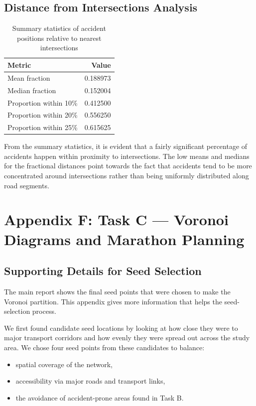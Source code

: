 \documentclass[acmsmall,nonacm,natbib=false]{acmart}
\begin{document}
\subsection{Distance from Intersections Analysis}
\label{appendix:part2taskB_q3}

\begin{table}[H]
\centering
\caption{Summary statistics of accident positions relative to nearest intersections}
\begin{tabular}{lr}
\toprule
Metric & Value \\
\midrule
Mean fraction & 0.188973 \\
Median fraction & 0.152004 \\
Proportion within 10\% & 0.412500 \\
Proportion within 20\% & 0.556250 \\
Proportion within 25\% & 0.615625 \\
\bottomrule
\end{tabular}
\end{table}

From the summary statistics, it is evident that a fairly significant percentage of accidents happen within proximity to intersections. The low means and medians for the fractional distances point towards the fact that accidents tend to be more concentrated around intersections rather than being uniformly distributed along road segments.

\section{Appendix F: Task C — Voronoi Diagrams and Marathon Planning}
\label{appendix:part2taskC}

\subsection{Supporting Details for Seed Selection}
\label{appendix:part2taskC_seeds}

The main report shows the final seed points that were chosen to make the Voronoi partition. 
This appendix gives more information that helps the seed-selection process.

We first found candidate seed locations by looking at how close they were to major transport corridors and how evenly they were spread out across the study area. We chose four seed points from these candidates to balance:
\begin{itemize} 
\item spatial coverage of the network,
\item accessibility via major roads and transport links,
\item the avoidance of accident-prone areas found in Task B. \end{itemize}
\end{document}
